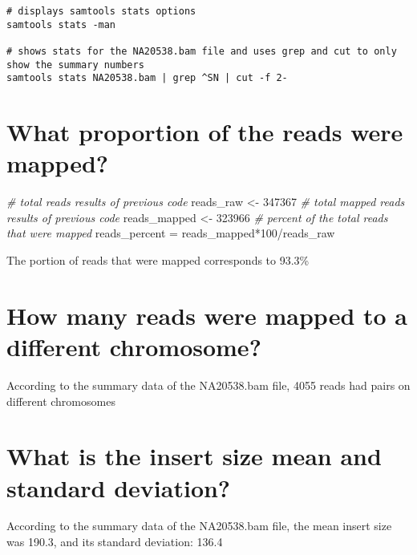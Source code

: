 \documentclass[
]{article}
\newenvironment{Shaded}{\begin{snugshade}}{\end{snugshade}}
\newcommand{\CommentTok}[1]{\textcolor[rgb]{0.56,0.35,0.01}{\textit{#1}}}
\newcommand{\DecValTok}[1]{\textcolor[rgb]{0.00,0.00,0.81}{#1}}
\newcommand{\NormalTok}[1]{#1}
\newcommand{\OtherTok}[1]{\textcolor[rgb]{0.56,0.35,0.01}{#1}}
\newcommand{\SpecialCharTok}[1]{\textcolor[rgb]{0.00,0.00,0.00}{#1}}
\begin{document}
\begin{verbatim}
# displays samtools stats options
samtools stats -man

# shows stats for the NA20538.bam file and uses grep and cut to only show the summary numbers
samtools stats NA20538.bam | grep ^SN | cut -f 2-
\end{verbatim}

\hypertarget{what-proportion-of-the-reads-were-mapped}{%
\section{What proportion of the reads were
mapped?}\label{what-proportion-of-the-reads-were-mapped}}

\begin{Shaded}
\begin{Highlighting}[]
\CommentTok{\# total reads results of previous code}
\NormalTok{reads\_raw }\OtherTok{\textless{}{-}} \DecValTok{347367}
\CommentTok{\# total mapped reads results of previous code}
\NormalTok{reads\_mapped }\OtherTok{\textless{}{-}} \DecValTok{323966}
\CommentTok{\# percent of the total reads that were mapped}
\NormalTok{reads\_percent }\OtherTok{=}\NormalTok{ reads\_mapped}\SpecialCharTok{*}\DecValTok{100}\SpecialCharTok{/}\NormalTok{reads\_raw}
\end{Highlighting}
\end{Shaded}

The portion of reads that were mapped corresponds to 93.3\%

\hypertarget{how-many-reads-were-mapped-to-a-different-chromosome}{%
\section{How many reads were mapped to a different
chromosome?}\label{how-many-reads-were-mapped-to-a-different-chromosome}}

According to the summary data of the NA20538.bam file, 4055 reads had
pairs on different chromosomes

\hypertarget{what-is-the-insert-size-mean-and-standard-deviation}{%
\section{What is the insert size mean and standard
deviation?}\label{what-is-the-insert-size-mean-and-standard-deviation}}

According to the summary data of the NA20538.bam file, the mean insert
size was 190.3, and its standard deviation: 136.4
\end{document}

